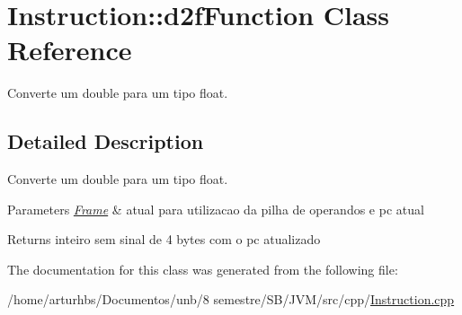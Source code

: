 \hypertarget{classInstruction_1_1d2fFunction}{}\section{Instruction\+:\+:d2f\+Function Class Reference}
\label{classInstruction_1_1d2fFunction}


Converte um double para um tipo float.  




\subsection{Detailed Description}
Converte um double para um tipo float. 


\begin{DoxyParams}{Parameters}
{\em \hyperlink{classFrame}{Frame}} & atual para utilizacao da pilha de operandos e pc atual \\
\hline
\end{DoxyParams}
\begin{DoxyReturn}{Returns}
inteiro sem sinal de 4 bytes com o pc atualizado 
\end{DoxyReturn}


The documentation for this class was generated from the following file\+:\begin{DoxyCompactItemize}
\item 
/home/arturhbs/\+Documentos/unb/8 semestre/\+S\+B/\+J\+V\+M/src/cpp/\hyperlink{Instruction_8cpp}{Instruction.\+cpp}\end{DoxyCompactItemize}
